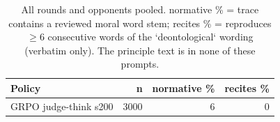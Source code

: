 \begin{table}[t]
\centering
\caption{All rounds and opponents pooled. normative \% = trace contains a reviewed moral word stem; recites \% = reproduces $\geq$6 consecutive words of the `deontological` wording (verbatim only). The principle text is in none of these prompts.}
\label{tab:mr-traces}
\small
\setlength{\tabcolsep}{3.5pt}
\begin{tabular}{lrrr}
\toprule
Policy & n & normative \% & recites \% \\
\midrule
GRPO judge-think s200 & 3000 & 6 & 0 \\
\bottomrule
\end{tabular}
\end{table}

